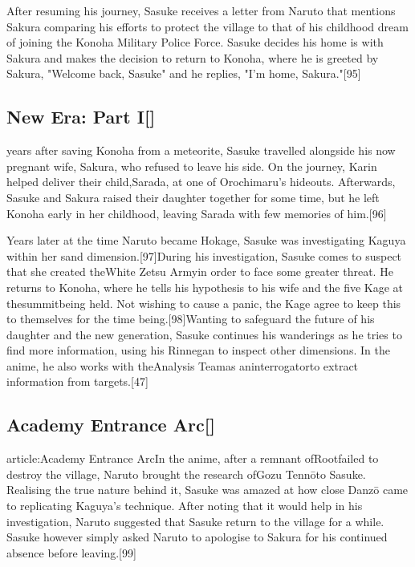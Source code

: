 \documentclass[a4paper,12pt]{article}
\begin{document}
After resuming his journey, Sasuke receives a letter from Naruto that mentions Sakura comparing his efforts to protect the village to that of his childhood dream of joining the Konoha Military Police Force. Sasuke decides his home is with Sakura and makes the decision to return to Konoha, where he is greeted by Sakura, "Welcome back, Sasuke" and he replies, "I'm home, Sakura."[95]\\ \par \vspace{0.5cm}

\subsection*{New Era: Part I[]}\n\nTwo years after saving Konoha from a meteorite, Sasuke travelled alongside his now pregnant wife, Sakura, who refused to leave his side. On the journey, Karin helped deliver their child,Sarada, at one of Orochimaru's hideouts. Afterwards, Sasuke and Sakura raised their daughter together for some time, but he left Konoha early in her childhood, leaving Sarada with few memories of him.[96]\\ \par \vspace{0.5cm}

Years later at the time Naruto became Hokage, Sasuke was investigating Kaguya within her sand dimension.[97]During his investigation, Sasuke comes to suspect that she created theWhite Zetsu Armyin order to face some greater threat. He returns to Konoha, where he tells his hypothesis to his wife and the five Kage at thesummitbeing held. Not wishing to cause a panic, the Kage agree to keep this to themselves for the time being.[98]Wanting to safeguard the future of his daughter and the new generation, Sasuke continues his wanderings as he tries to find more information, using his Rinnegan to inspect other dimensions. In the anime, he also works with theAnalysis Teamas aninterrogatorto extract information from targets.[47]\\ \par \vspace{0.5cm}

\subsection*{Academy Entrance Arc[]}\n\nMain article:Academy Entrance ArcIn the anime, after a remnant ofRootfailed to destroy the village, Naruto brought the research ofGozu Tennōto Sasuke. Realising the true nature behind it, Sasuke was amazed at how close Danzō came to replicating Kaguya's technique. After noting that it would help in his investigation, Naruto suggested that Sasuke return to the village for a while. Sasuke however simply asked Naruto to apologise to Sakura for his continued absence before leaving.[99]\\ \par \vspace{0.5cm}
\end{document}
